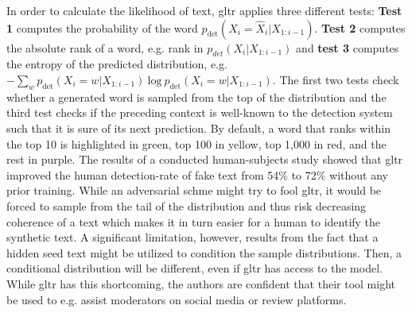 In order to calculate the likelihood of text, \gls{gltr} applies three different tests: \textbf{Test 1} computes the probability of the word $ p_{\text{det}}(X_i = \hat{X}_i | X_{1:i-1}) $. \textbf{Test 2} computes the absolute rank of a word, e.g. rank in $ p_{det}(X_i | X_{1:i-1}) $ and \textbf{test 3} computes the entropy of the predicted distribution, e.g. $ - \sum_w p_{\text{det}}(X_i = w | X_{1:i-1}) \ \text{log} \ p_{\text{det}}(X_i = w | X_{1:i-1}) $. The first two tests check whether a generated word is sampled from the top of the distribution and the third test checks if the preceding context is well-known to the detection system such that it is sure of its next prediction. By default, a word that ranks within the top 10 is highlighted in green, top 100 in yellow, top 1,000 in red, and the rest in purple. The results of a conducted human-subjects study showed that \gls{gltr} improved the human detection-rate of fake text from 54\% to 72\% without any prior training. While an adversarial schme might try to fool \gls{gltr}, it would be forced to sample from the tail of the distribution and thus risk decreasing coherence of a text which makes it in turn easier for a human to identify the synthetic text. A significant limitation, however, results from the fact that a hidden seed text might be utilized to condition the sample distributions. Then, a conditional distribution will be different, even if \gls{gltr} has access to the model. While \gls{gltr} has this shortcoming, the authors are confident that their tool might be used to e.g. assist moderators on social media or review platforms.
